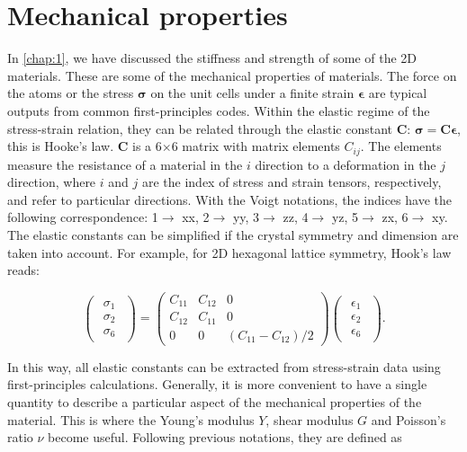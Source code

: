 \section{Mechanical properties}

In \autoref{chap:1}, we have discussed the stiffness and strength of some of the 2D materials. These are some of the mechanical properties of materials. The force on the atoms or the stress $\boldsymbol{\sigma}$ on the unit cells under a finite strain $\boldsymbol{\epsilon}$ are typical outputs from common first-principles codes. Within the elastic regime of the stress-strain relation, they can be related through the elastic constant $\boldsymbol{C}$: $\boldsymbol{\sigma}=\boldsymbol{C}\boldsymbol{\epsilon}$, this is Hooke's law. $\boldsymbol{C}$ is a 6$\times$6 matrix with matrix elements $C_{ij}$. The elements measure the resistance of a material in the $i$ direction to a deformation in the $j$ direction, where $i$ and $j$ are the index of stress and strain tensors, respectively, and refer to particular directions.  With the Voigt notations, the indices have the following correspondence: 1$\rightarrow$ xx, 2$\rightarrow$ yy, 3$\rightarrow$ zz, 4$\rightarrow$ yz, 5$\rightarrow$ zx, 6$\rightarrow$ xy. The elastic constants can be simplified if the crystal symmetry and dimension are taken into account. For example, for 2D hexagonal lattice symmetry, Hook's law reads:

\begin{equation}
\begin{pmatrix} \begin{array}{c} \sigma_1 \\ \sigma_2 \\ \sigma_6 \end{array} 
\end{pmatrix}
=
 \begin{pmatrix}
  C_{11} & C_{12} & 0  \\
  C_{12} & C_{11} & 0  \\
  0 & 0 & (C_{11}-C_{12})/2
 \end{pmatrix}
 \begin{pmatrix} \begin{array}{c} \epsilon_1 \\ \epsilon_2 \\ \epsilon_6 
\end{array} \end{pmatrix}.
\end{equation} 

In this way, all elastic constants can be extracted from stress-strain data using first-principles calculations. Generally, it is more convenient to have a single quantity to describe a particular aspect of the mechanical properties of the material. This is where the Young's modulus $Y$, shear modulus $G$ and Poisson's ratio $\nu$ become useful. Following previous notations, they are defined as 

